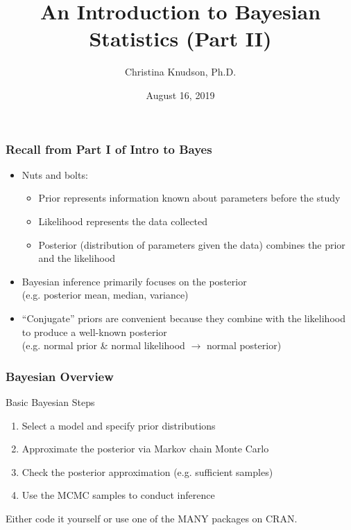 \documentclass{beamer}
\title{An Introduction to Bayesian Statistics (Part II)}
\author{Christina Knudson, Ph.D.}
\institute{noRth}
\date{August 16,  2019}
\begin{document}
\frame{\titlepage} 



\begin{frame}
\frametitle{Recall from Part I of Intro to Bayes}


\begin{itemize}
\item Nuts and bolts: 
\begin{itemize}
\item Prior represents information known about parameters before the study
\item Likelihood represents the data collected
\item Posterior (distribution of parameters given the data) combines the prior and the likelihood
\end{itemize} \pause
\item Bayesian inference primarily focuses on the posterior \\ {\small (e.g. posterior mean, median, variance)} \pause
\item ``Conjugate'' priors are convenient  because they combine with the likelihood to produce a well-known posterior \\
{\small (e.g.  normal prior \& normal likelihood $\longrightarrow$ normal posterior) }

\end{itemize}
\end{frame}


\begin{frame}
\frametitle{ Bayesian Overview  }
%
%
%



\begin{block}{Basic Bayesian Steps}

\begin{enumerate}
\item Select a model and specify prior distributions
\item Approximate the posterior via Markov chain Monte Carlo
\item Check the posterior approximation (e.g. sufficient samples)
\item Use the MCMC samples to conduct inference 
 \end{enumerate}
\end{block}

\vspace{.5cm}

Either code it yourself or use one of the MANY packages on CRAN.

\end{frame}
\end{document}
